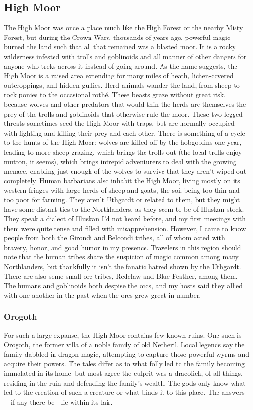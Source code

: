 \documentclass[10pt,a4paper,twoside,twocolumn,openany,bg=print,nodeprecatedcode]{dndbook}
\begin{document}
\subsection{High Moor}
The High Moor was once a place much like the High Forest or the nearby Misty Forest, but during the Crown Wars, thousands of years ago, powerful magic burned the land such that all that remained was a blasted moor. It is a rocky wilderness infested with trolls and goblinoids and all manner of other dangers for anyone who treks across it instead of going around.
As the name suggests, the High Moor is a raised area extending for many miles of heath, lichen-covered outcroppings, and hidden gullies. Herd animals wander the land, from sheep to rock ponies to the occasional rothé. These beasts graze without great risk, because wolves and other predators that would thin the herds are themselves the prey of the trolls and goblinoids that otherwise rule the moor. These two-legged threats sometimes seed the High Moor with traps, but are normally occupied with fighting and killing their prey and each other. There is something of a cycle to the hunts of the High Moor: wolves are killed off by the hobgoblins one year, leading to more sheep grazing, which brings the trolls out (the local trolls enjoy mutton, it seems), which brings intrepid adventurers to deal with the growing menace, enabling just enough of the wolves to survive that they aren't wiped out completely.
Human barbarians also inhabit the High Moor, living mostly on its western fringes with large herds of sheep and goats, the soil being too thin and too poor for farming. They aren't Uthgardt or related to them, but they might have some distant ties to the Northlanders, as they seem to be of Illuskan stock. They speak a dialect of Illuskan I'd not heard before, and my first meetings with them were quite tense and filled with misapprehension. However, I came to know people from both the Girondi and Belcondi tribes, all of whom acted with bravery, honor, and good humor in my presence. Travelers in this region should note that the human tribes share the suspicion of magic common among many Northlanders, but thankfully it isn't the fanatic hatred shown by the Uthgardt.
There are also some small orc tribes, Redclaw and Blue Feather, among them. The humans and goblinoids both despise the orcs, and my hosts said they allied with one another in the past when the orcs grew great in number.
\subsubsection{Orogoth}
For such a large expanse, the High Moor contains few known ruins. One such is Orogoth, the former villa of a noble family of old Netheril. Local legends say the family dabbled in dragon magic, attempting to capture those powerful wyrms and acquire their powers. The tales differ as to what folly led to the family becoming immolated in its home, but most agree the culprit was a dracolich, of all things, residing in the ruin and defending the family's wealth. The gods only know what led to the creation of such a creature or what binds it to this place. The answers—if any there be—lie within its lair.
\end{document}
